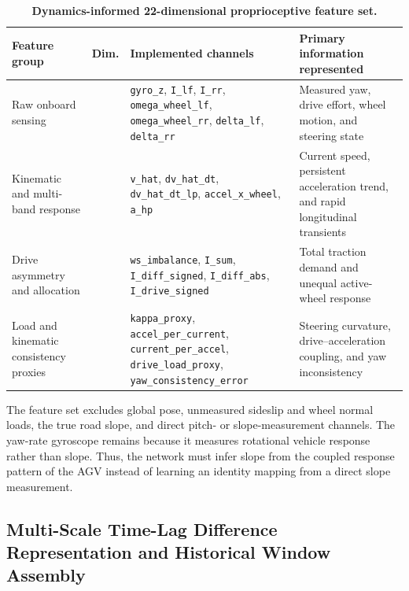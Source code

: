 \documentclass{ieeeaccess}
\begin{document}
\begin{table}[!tbp]
\centering
\caption{\textbf{Dynamics-informed 22-dimensional proprioceptive feature set.}}
\label{tab:feature_contract_22d}
\setlength{\tabcolsep}{3pt}
\begin{tabular}{|>{\raggedright\arraybackslash}p{}|>{\centering\arraybackslash}p{}|>{\raggedright\arraybackslash}p{}|>{\raggedright\arraybackslash}p{}|}
\hline
Feature group & Dim. & Implemented channels & Primary information represented \\
\hline
Raw onboard sensing & 7 & \texttt{gyro\_z}, \texttt{I\_lf}, \texttt{I\_rr}, \texttt{omega\_wheel\_lf}, \texttt{omega\_wheel\_rr}, \texttt{delta\_lf}, \texttt{delta\_rr} & Measured yaw, drive effort, wheel motion, and steering state \\
Kinematic and multi-band response & 5 & \texttt{v\_hat}, \texttt{dv\_hat\_dt}, \texttt{dv\_hat\_dt\_lp}, \texttt{accel\_x\_wheel}, \texttt{a\_hp} & Current speed, persistent acceleration trend, and rapid longitudinal transients \\
Drive asymmetry and allocation & 5 & \texttt{ws\_imbalance}, \texttt{I\_sum}, \texttt{I\_diff\_signed}, \texttt{I\_diff\_abs}, \texttt{I\_drive\_signed} & Total traction demand and unequal active-wheel response \\
Load and kinematic consistency proxies & 5 & \texttt{kappa\_proxy}, \texttt{accel\_per\_current}, \texttt{current\_per\_accel}, \texttt{drive\_load\_proxy}, \texttt{yaw\_consistency\_error} & Steering curvature, drive--acceleration coupling, and yaw inconsistency \\
\hline
\end{tabular}
\end{table}

The feature set excludes global pose, unmeasured sideslip and wheel normal loads, the true road slope, and direct pitch- or slope-measurement channels. The yaw-rate gyroscope remains because it measures rotational vehicle response rather than slope. Thus, the network must infer slope from the coupled response pattern of the AGV instead of learning an identity mapping from a direct slope measurement.

\subsection{Multi-Scale Time-Lag Difference Representation and Historical Window Assembly}
\end{document}
